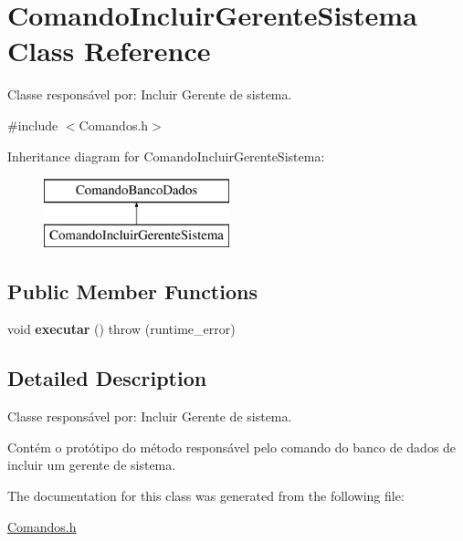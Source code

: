 \hypertarget{class_comando_incluir_gerente_sistema}{}\section{Comando\+Incluir\+Gerente\+Sistema Class Reference}
\label{class_comando_incluir_gerente_sistema}


Classe responsável por\+: Incluir Gerente de sistema.  




{\ttfamily \#include $<$Comandos.\+h$>$}

Inheritance diagram for Comando\+Incluir\+Gerente\+Sistema\+:\begin{figure}[H]
\begin{center}
\leavevmode
\includegraphics[height=2.000000cm]{class_comando_incluir_gerente_sistema}
\end{center}
\end{figure}
\subsection*{Public Member Functions}
\begin{DoxyCompactItemize}
\item 
\hypertarget{class_comando_incluir_gerente_sistema_a700ab7da317009ed1de092fb35fd38fd}{}\label{class_comando_incluir_gerente_sistema_a700ab7da317009ed1de092fb35fd38fd} 
void {\bfseries executar} ()  throw (runtime\+\_\+error)
\end{DoxyCompactItemize}


\subsection{Detailed Description}
Classe responsável por\+: Incluir Gerente de sistema. 

Contém o protótipo do método responsável pelo comando do banco de dados de incluir um gerente de sistema. 

The documentation for this class was generated from the following file\+:\begin{DoxyCompactItemize}
\item 
\hyperlink{_comandos_8h}{Comandos.\+h}\end{DoxyCompactItemize}
